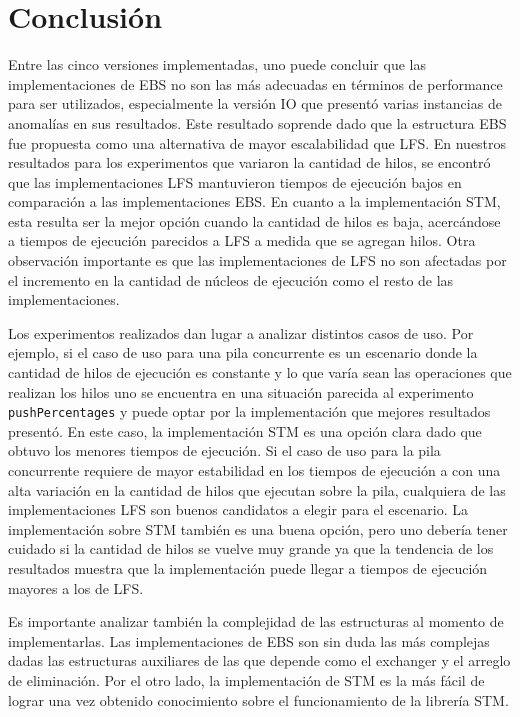 \chapter{Conclusión}

Entre las cinco versiones implementadas, uno puede concluir que las implementaciones de EBS no son las más adecuadas en términos de performance para ser utilizados, especialmente la versión IO que presentó varias instancias de anomalías en sus resultados. Este resultado soprende dado que la estructura EBS fue propuesta como una alternativa de mayor escalabilidad que LFS. En nuestros resultados para los experimentos que variaron la cantidad de hilos, se encontró que las implementaciones LFS mantuvieron tiempos de ejecución bajos en comparación a las implementaciones EBS. En cuanto a la implementación STM, esta resulta ser la mejor opción cuando la cantidad de hilos es baja, acercándose a tiempos de ejecución parecidos a LFS a medida que se agregan hilos. Otra observación importante es que las implementaciones de LFS no son afectadas por el incremento en la cantidad de núcleos de ejecución como el resto de las implementaciones.

Los experimentos realizados dan lugar a analizar distintos casos de uso. Por ejemplo, si el caso de uso para una pila concurrente es un escenario donde la cantidad de hilos de ejecución es constante y lo que varía sean las operaciones que realizan los hilos uno se encuentra en una situación parecida al experimento \texttt{pushPercentages} y puede optar por la implementación que mejores resultados presentó. En este caso, la implementación STM es una opción clara dado que obtuvo los menores tiempos de ejecución. Si el caso de uso para la pila concurrente requiere de mayor estabilidad en los tiempos de ejecución a con una alta variación en la cantidad de hilos que ejecutan sobre la pila, cualquiera de las implementaciones LFS son buenos candidatos a elegir para el escenario. La implementación sobre STM también es una buena opción, pero uno debería tener cuidado si la cantidad de hilos se vuelve muy grande ya que la tendencia de los resultados muestra que la implementación puede llegar a tiempos de ejecución mayores a los de LFS.

Es importante analizar también la complejidad de las estructuras al momento de implementarlas. Las implementaciones de EBS son sin duda las más complejas dadas las estructuras auxiliares de las que depende como el exchanger y el arreglo de eliminación. Por el otro lado, la implementación de STM es la más fácil de lograr una vez obtenido conocimiento sobre el funcionamiento de la librería STM.

